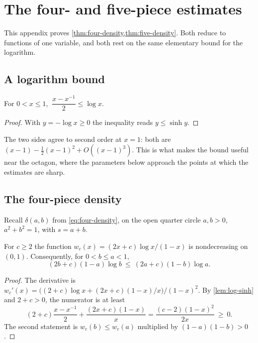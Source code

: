 \section{The four- and five-piece estimates}\label{app:terminal-estimates}

This appendix proves \cref{thm:four-density,thm:five-density}. Both reduce to functions of one
variable, and both rest on the same elementary bound for the logarithm.

\subsection{A logarithm bound}\label{app:log-bound}

\begin{lemma}\label{lem:log-sinh}
For $0<x\le1$, $\ \dfrac{x-x^{-1}}{2}\le\log x$.
\end{lemma}

\begin{proof}
With $y=-\log x\ge0$ the inequality reads $y\le\sinh y$.
\end{proof}

The two sides agree to second order at $x=1$: both are $(x-1)-\tfrac12(x-1)^2+O((x-1)^3)$. This
is what makes the bound useful near the octagon, where the parameters below approach the points
at which the estimates are sharp.

\subsection{The four-piece density}\label{app:four-density}

Recall $\delta(a,b)$ from \eqref{eq:four-density}, on the open quarter circle $a,b>0$,
$a^2+b^2=1$, with $s=a+b$.

\begin{lemma}\label{lem:four-weight}
For $c\ge2$ the function $w_c(x)=(2x+c)\log x/(1-x)$ is nondecreasing on $(0,1)$. Consequently,
for $0<b\le a<1$,
\[
 (2b+c)(1-a)\log b\ \le\ (2a+c)(1-b)\log a.
\]
\end{lemma}

\begin{proof}
The derivative is $w_c'(x)=\bigl((2+c)\log x+(2x+c)(1-x)/x\bigr)/(1-x)^2$. By
\cref{lem:log-sinh} and $2+c>0$, the numerator is at least
\[
 (2+c)\frac{x-x^{-1}}{2}+\frac{(2x+c)(1-x)}{x}=\frac{(c-2)(1-x)^2}{2x}\ \ge\ 0.
\]
The second statement is $w_c(b)\le w_c(a)$ multiplied by $(1-a)(1-b)>0$.
\end{proof}

